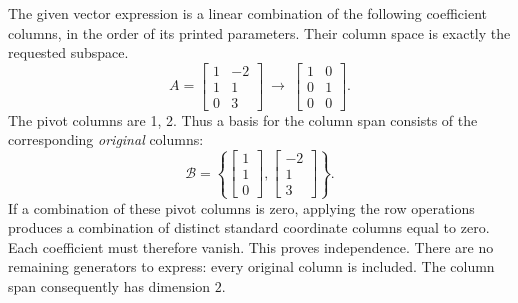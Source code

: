 The given vector expression is a linear combination of the following coefficient columns, in the order of its printed parameters. Their column space is exactly the requested subspace.
\[A=\left[\begin{array}{rr}1&-2\\1&1\\0&3\end{array}\right]\ \longrightarrow\ \left[\begin{array}{rr}1&0\\0&1\\0&0\end{array}\right].\]
The pivot columns are 1, 2. Thus a basis for the column span consists of the corresponding \emph{original} columns:
\[\mathcal B=\left\{\left[\begin{array}{r}1\\1\\0\end{array}\right],\left[\begin{array}{r}-2\\1\\3\end{array}\right]\right\}.\]
If a combination of these pivot columns is zero, applying the row operations produces a combination of distinct standard coordinate columns equal to zero. Each coefficient must therefore vanish. This proves independence. There are no remaining generators to express: every original column is included. The column span consequently has dimension $2$.

